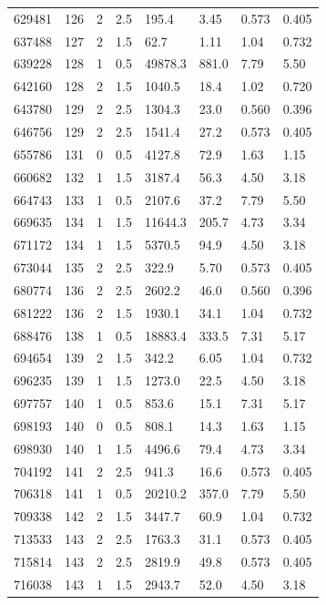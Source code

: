 \documentclass[preview]{standalone}
\begin{document}
{{{\begin{tabular}{L{1.2cm}C{1.2cm} C{0.3cm}C{0.5cm} C{1.4cm}C{1.4cm} C{1.4cm}C{1.4cm}}
  629481  &   126  & 2     & 2.5 &  195.4  & 3.45  & 0.573 &  0.405   \\ 
  637488  &   127  & 2     & 1.5 &  62.7  & 1.11  & 1.04 &  0.732   \\ 
  639228  &   128  & 1     & 0.5 &  49878.3  & 881.0  & 7.79 &  5.50   \\ 
  642160  &   128  & 2     & 1.5 &  1040.5  & 18.4  & 1.02 &  0.720   \\ 
  643780  &   129  & 2     & 2.5 &  1304.3  & 23.0  & 0.560 &  0.396   \\ 
  646756  &   129  & 2     & 2.5 &  1541.4  & 27.2  & 0.573 &  0.405   \\ 
  655786  &   131  & 0     & 0.5 &  4127.8  & 72.9  & 1.63 &  1.15   \\ 
  660682  &   132  & 1     & 1.5 &  3187.4  & 56.3  & 4.50 &  3.18   \\ 
  664743  &   133  & 1     & 0.5 &  2107.6  & 37.2  & 7.79 &  5.50   \\ 
  669635  &   134  & 1     & 1.5 &  11644.3  & 205.7  & 4.73 &  3.34   \\ 
  671172  &   134  & 1     & 1.5 &  5370.5  & 94.9  & 4.50 &  3.18   \\ 
  673044  &   135  & 2     & 2.5 &  322.9  & 5.70  & 0.573 &  0.405   \\ 
  680774  &   136  & 2     & 2.5 &  2602.2  & 46.0  & 0.560 &  0.396   \\ 
  681222  &   136  & 2     & 1.5 &  1930.1  & 34.1  & 1.04 &  0.732   \\ 
  688476  &   138  & 1     & 0.5 &  18883.4  & 333.5  & 7.31 &  5.17   \\ 
  694654  &   139  & 2     & 1.5 &  342.2  & 6.05  & 1.04 &  0.732   \\ 
  696235  &   139  & 1     & 1.5 &  1273.0  & 22.5  & 4.50 &  3.18   \\ 
  697757  &   140  & 1     & 0.5 &  853.6  & 15.1  & 7.31 &  5.17   \\ 
  698193  &   140  & 0     & 0.5 &  808.1  & 14.3  & 1.63 &  1.15   \\ 
  698930  &   140  & 1     & 1.5 &  4496.6  & 79.4  & 4.73 &  3.34   \\ 
  704192  &   141  & 2     & 2.5 &  941.3  & 16.6  & 0.573 &  0.405   \\ 
  706318  &   141  & 1     & 0.5 &  20210.2  & 357.0  & 7.79 &  5.50   \\ 
  709338  &   142  & 2     & 1.5 &  3447.7  & 60.9  & 1.04 &  0.732   \\ 
  713533  &   143  & 2     & 2.5 &  1763.3  & 31.1  & 0.573 &  0.405   \\ 
  715814  &   143  & 2     & 2.5 &  2819.9  & 49.8  & 0.573 &  0.405   \\ 
  716038  &   143  & 1     & 1.5 &  2943.7  & 52.0  & 4.50 &  3.18   \\ 
\hline 
\end{tabular} 

}}}
\end{document}
